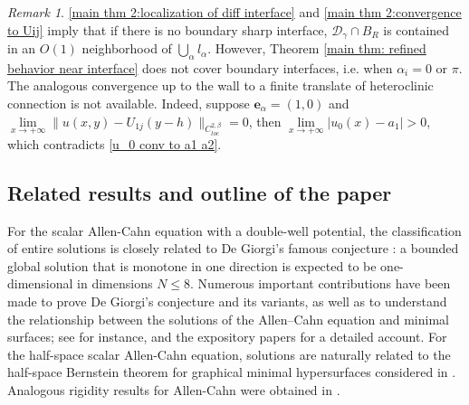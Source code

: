 \documentclass[leqno,11pt]{amsart}
\let\al=\alpha
\let\g=\gamma
\theoremstyle{remark}
\newtheorem{rmk}{Remark}[section]
\begin{document}
\begin{rmk}
    \eqref{main thm 2:localization of diff interface} and \eqref{main thm 2:convergence to Uij} imply that if there is no boundary sharp interface, $\mathcal{D}_\g\cap B_R$ is contained in an $O(1)$ neighborhood of $\bigcup\limits_{\al}l_\al$. However, Theorem \ref{main thm: refined behavior near interface} does not cover boundary interfaces, i.e. when $\al_i=0$ or $\pi$. The analogous convergence up to the wall to a finite translate of heteroclinic connection is not available. Indeed, suppose $\mathbf{e}_\al=(1,0)$ and $\lim\limits_{x\to +\infty}\|u(x,y)-U_{1j}(y-h)\|_{C^{2,\beta}_{loc}}=0$, then $\lim\limits_{x\to+\infty}|u_0(x)-a_1|>0$, which contradicts \eqref{u_0 conv to a1 a2}.
\end{rmk}

\subsection{Related results and outline of the paper}


For the scalar Allen-Cahn equation with a double-well potential, the classification of entire solutions is closely related to De Giorgi's famous conjecture \cite{Degiorgi1978}: a bounded global solution that is monotone in one direction is expected to be one-dimensional in dimensions $N\leq 8$. Numerous important contributions have been made to prove De Giorgi's conjecture and its variants, as well as to understand the relationship between the solutions of the Allen–Cahn equation and minimal surfaces; see for instance, \cite{ghoussoub1998conjecture,ambrosio2000entire,savin2009regularity,farina20111d,del2011giorgi, tonegawa2012stable,pacard2013stable,liu2017global,wang2017new,guaraco2018min,wang2019finite,wang2019second,florit2025stable} and the expository papers \cite{savin2010minimal,chan2018giorgi} for a detailed account. For the half-space scalar Allen-Cahn equation, solutions are naturally related to the half-space Bernstein theorem for graphical minimal hypersurfaces considered in \cite{edelen2022bernstein,du2023half}. Analogous rigidity results for Allen-Cahn were obtained in \cite{farina2010flattening,hamel2021half,du2024flat}.
\end{document}
